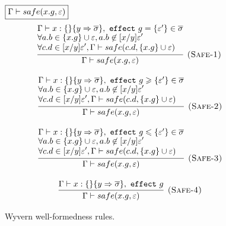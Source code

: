 \begin{figure}[!t]
{$\fbox{$\Gamma \vdash safe(x.g, \varepsilon)$}$
\[
\begin{array}{c}
\hspace{-2pt}
\infer[\textsc{(Safe-1)}]
  {\Gamma \vdash safe(x.g, \varepsilon)}
  {\Gamma \vdash x: \{\} \{y \Rightarrow \overline{\sigma}\}, 
  ~\keyw{effect} g = \{\varepsilon'\} \in \overline{\sigma} \\
  \begin{gathered} \forall a.b \in \{x.g\}\cup\varepsilon, a.b \not\in [x/y]\varepsilon' \end{gathered} \\
   \begin{gathered} \forall c.d \in [x/y]\varepsilon', \Gamma \vdash safe(c.d, \{x.g\}\cup\varepsilon \end{gathered})
  } \\[3ex]
\infer[\textsc{(Safe-2)}]
  {\Gamma \vdash safe(x.g, \varepsilon)}
  {\Gamma \vdash x: \{\} \{y \Rightarrow \overline{\sigma}\}, 
  ~\keyw{effect} g \geqslant \{\varepsilon'\} \in \overline{\sigma} \\
  \begin{gathered} \forall a.b \in \{x.g\}\cup\varepsilon, a.b \not\in [x/y]\varepsilon' \end{gathered} \\
   \begin{gathered} \forall c.d \in [x/y] \varepsilon',  \Gamma \vdash safe(c.d, \{x.g\}\cup\varepsilon \end{gathered})
  } \\[3ex]
\infer[\textsc{(Safe-3)}]
  {\Gamma \vdash safe(x.g, \varepsilon)}
  {\Gamma \vdash x: \{\} \{y \Rightarrow \overline{\sigma}\}, 
  ~\keyw{effect} g \leqslant \{\varepsilon'\} \in \overline{\sigma} \\
  \begin{gathered} \forall a.b \in \{x.g\}\cup\varepsilon, a.b \not\in [x/y]\varepsilon' \end{gathered} \\
   \begin{gathered} \forall c.d \in [x/y]\varepsilon',  \Gamma \vdash safe(c.d, \{x.g\}\cup\varepsilon \end{gathered})
  }  \\[3ex]
\infer[\textsc{(Safe-4)}]
  {\Gamma \vdash safe(x.g, \varepsilon)}
  {\Gamma \vdash x: \{\} \{y \Rightarrow \overline{\sigma}\}, 
  ~\keyw{effect} g \\
  } 
\end{array}
\]
}
\caption{Wyvern well-formedness rules.}
\label{f-well-formedness}
\end{figure}


